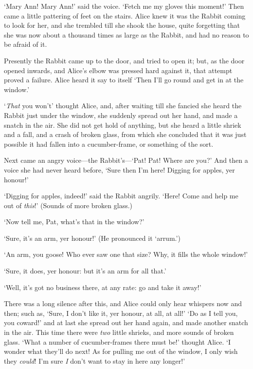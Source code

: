 \documentclass[12pt,openany]{memoir}
\begin{document}
`Mary Ann! Mary Ann!' said the voice. `Fetch me my gloves this moment!' Then came a little pattering of feet on the stairs. Alice knew it was the Rabbit coming to look for her, and she trembled till she shook the house, quite forgetting that she was now about a thousand times as large as the Rabbit, and had no reason to be afraid of it.

Presently the Rabbit came up to the door, and tried to open it; but, as the door opened inwards, and Alice's elbow was pressed hard against it, that attempt proved a failure. Alice heard it say to itself `Then I'll go round and get in at the window.'

`\textit{That} you won't' thought Alice, and, after waiting till she fancied she heard the Rabbit just under the window, she suddenly spread out her hand, and made a snatch in the air. She did not get hold of anything, but she heard a little shriek and a fall, and a crash of broken glass, from which she concluded that it was just possible it had fallen into a cucumber-frame, or something of the sort.

Next came an angry voice---the Rabbit's---`Pat! Pat! Where are you?' And then a voice she had never heard before, `Sure then I'm here! Digging for apples, yer honour!'

`Digging for apples, indeed!' said the Rabbit angrily. `Here! Come and help me out of \textit{this}!' (Sounds of more broken glass.)

`Now tell me, Pat, what's that in the window?'

`Sure, it's an arm, yer honour!' (He pronounced it `arrum.')

`An arm, you goose! Who ever saw one that size? Why, it fills the whole window!'

`Sure, it does, yer honour: but it's an arm for all that.'

`Well, it's got no business there, at any rate: go and take it away!'

There was a long silence after this, and Alice could only hear whispers now and then; such as, `Sure, I don't like it, yer honour, at all, at all!' `Do as I tell you, you coward!' and at last she spread out her hand again, and made another snatch in the air. This time there were \textit{two} little shrieks, and more sounds of broken glass. `What a number of cucumber-frames there must be!' thought Alice. `I wonder what they'll do next! As for pulling me out of the window, I only wish they \textit{could}! I'm sure \textit{I} don't want to stay in here any longer!'
\end{document}
